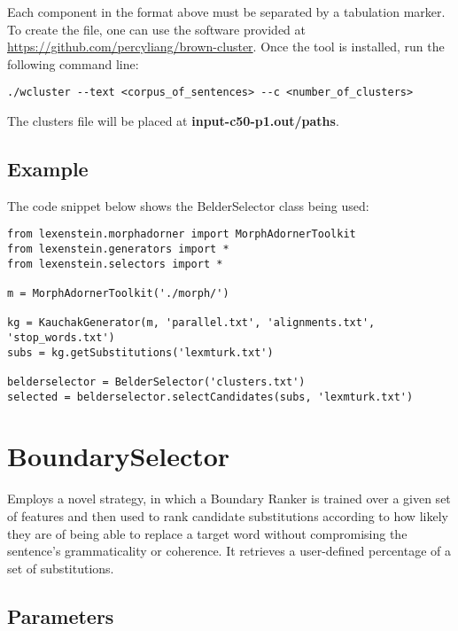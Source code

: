 Each component in the format above must be separated by a tabulation marker. To create the file, one can use the software provided at \url{https://github.com/percyliang/brown-cluster}. Once the tool is installed, run the following command line:

\begin{lstlisting}
./wcluster --text <corpus_of_sentences> --c <number_of_clusters>
\end{lstlisting}

The clusters file will be placed at \textbf{input-c50-p1.out/paths}.

\subsection{Example}

The code snippet below shows the BelderSelector class being used:

\begin{lstlisting}
from lexenstein.morphadorner import MorphAdornerToolkit
from lexenstein.generators import *
from lexenstein.selectors import *

m = MorphAdornerToolkit('./morph/')

kg = KauchakGenerator(m, 'parallel.txt', 'alignments.txt', 'stop_words.txt')
subs = kg.getSubstitutions('lexmturk.txt')

belderselector = BelderSelector('clusters.txt')
selected = belderselector.selectCandidates(subs, 'lexmturk.txt')
\end{lstlisting}









\section{BoundarySelector}

Employs a novel strategy, in which a Boundary Ranker is trained over a given set of features and then used to rank candidate substitutions according to how likely they are of being able to replace a target word without compromising the sentence's grammaticality or coherence. It retrieves a user-defined percentage of a set of substitutions.

\subsection{Parameters}

